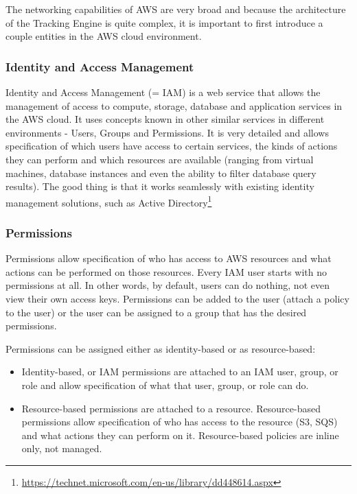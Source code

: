 The networking capabilities of AWS are very broad and because the architecture of the Tracking Engine is quite complex, it is important to first introduce a couple entities in the AWS cloud environment.

\subsubsection*{Identity and Access Management}

Identity and Access Management (= IAM) is a web service that allows the management of access to compute, storage, database and application services in the AWS cloud. It uses concepts known in other similar services in different environments - Users, Groups and Permissions. It is very detailed and allows specification of which users have access to certain services, the kinds of actions they can perform and which resources are available (ranging from virtual machines, database instances and even the ability to filter database query results). The good thing is that it works seamlessly with existing identity management solutions, such as Active Directory\footnote{\url{https://technet.microsoft.com/en-us/library/dd448614.aspx}}

\subsubsection*{Permissions}

Permissions allow specification of who has access to AWS resources and what actions can be performed on those resources. Every IAM user starts with no permissions at all. In other words, by default, users can do nothing, not even view their own access keys. Permissions can be added to the user (attach a policy to the user) or the user can be assigned to a group that has the desired permissions.

\newpage

Permissions can be assigned either as identity-based or as resource-based:

\begin{itemize}
	\item Identity-based, or IAM permissions are attached to an IAM user, group, or role and allow specification of what that user, group, or role can do.
	\item Resource-based permissions are attached to a resource. Resource-based permissions allow specification of who has access to the resource (S3, SQS) and what actions they can perform on it. Resource-based policies are inline only, not managed.
\end{itemize}

